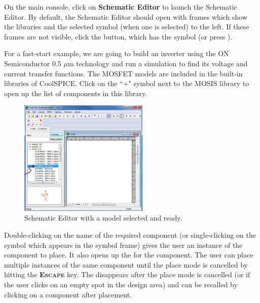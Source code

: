 On the main console, click on \textbf{Schematic Editor} to launch the Schematic Editor. By default, the Schematic Editor should open with frames which show the libraries and the selected symbol (when one is selected) to the left.  If these frames are not visible, click the  button, which has the symbol \fbox{$\Omega$} (or press ).  

For a fast-start example, we are going to build an inverter using the ON Semiconductor 0.5 $\mu$m technology and run a simulation to find its voltage and current transfer functions.  The MOSFET models are included in the built-in libraries of CoolSPICE.  Click on the ``+" symbol next to the MOSIS library to open up the list of components in this library.

\begin{figure}
    \includegraphics[width=0.55\textwidth]{./figures/getting_started_figures/CoolSPICE_emptySchematicEditor.png}
    \caption{{Schematic Editor with a model selected and ready.}}
  \label{fig_emptyschematiceditor}
\end{figure}


Double-clicking on the name of the required component (or single-clicking on the symbol which appears in the symbol frame) gives the user an instance of the component to place.   It also opens up the  for the component.   The user can place multiple instances of the same component until the place mode is cancelled by hitting the \textsf{\textbf{\textsc{Escape}}} key.  The  disappears after the place mode is cancelled (or if the user clicks on an empty spot in the design area) and can be recalled by clicking on a component after placement.

